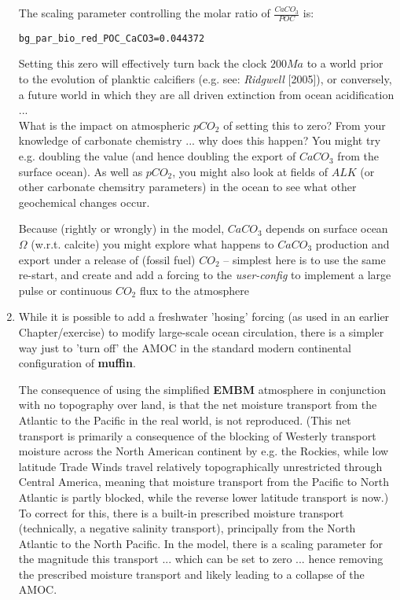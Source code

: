 \begin{enumerate}[noitemsep]
\vspace{1mm}
The scaling parameter controlling the molar ratio of \(\frac{CaCO_{3}}{POC}\) is:
\vspace{-1pt}\small\begin{verbatim}
bg_par_bio_red_POC_CaCO3=0.044372
\end{verbatim}\normalsize\vspace{-1pt}
Setting this zero will effectively turn back the clock \(200Ma\) to a world prior to the evolution of planktic calcifiers (e.g. see: \textit{Ridgwell} [2005]), or conversely, a future world in which they are all driven extinction from ocean acidification ... 
\vspace{1mm}
\\What is the impact on atmospheric \(pCO_{2}\) of setting this to zero? From your knowledge of carbonate chemistry ... why does this happen? You might try e.g. doubling the value (and hence doubling the export of \(CaCO_{3}\) from the surface ocean). As well as \(pCO_{2}\), you might also look at fields of \(ALK\) (or other carbonate chemsitry parameters) in the ocean to see what other geochemical changes occur.

Because (rightly or wrongly) in the model, \(CaCO_{3}\) depends on surface ocean \(\Omega\) (w.r.t. calcite) you might explore what happens to \(CaCO_{3}\) production and export under a release of (fossil fuel) \(CO_{2}\) -- simplest here is to use the same re-start, and create and add a forcing to the \textit{user-config} to implement a large pulse or continuous \(CO_{2}\) flux to the atmosphere

\newpage
%
\item While it is possible to add a freshwater 'hosing' forcing (as used in an earlier Chapter/exercise) to modify large-scale ocean circulation, there is a simpler way just to 'turn off' the AMOC in the standard modern continental configuration of \textbf{muffin}.

\vspace{1mm}
The consequence of using the simplified \textbf{EMBM} atmosphere in conjunction with no topography over land, is that the net moisture transport from the Atlantic to the Pacific in the real world, is not reproduced. (This net transport is primarily a consequence of the blocking of Westerly transport moisture across the North American continent by e.g. the Rockies, while low latitude Trade Winds travel relatively topographically unrestricted through Central America, meaning that moisture transport from the Pacific to North Atlantic is partly blocked, while the reverse lower latitude transport is now.) To correct for this, there is a built-in prescribed moisture transport (technically, a negative salinity transport), principally from the North Atlantic to the North Pacific. In the model, there is a scaling parameter for the magnitude this transport ... which can be set to zero ... hence removing the prescribed moisture transport and likely leading to a collapse of the AMOC.


\end{enumerate}
